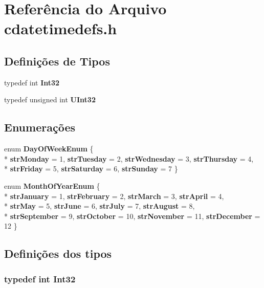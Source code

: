 \section{Referência do Arquivo cdatetimedefs.\+h}
\label{cdatetimedefs_8h}
\subsection*{Definições de Tipos}
\begin{DoxyCompactItemize}
\item 
typedef int {\bf Int32}
\item 
typedef unsigned int {\bf U\+Int32}
\end{DoxyCompactItemize}
\subsection*{Enumerações}
\begin{DoxyCompactItemize}
\item 
enum {\bf Day\+Of\+Week\+Enum} \{ \\*
{\bf str\+Monday} = 1, 
{\bf str\+Tuesday} = 2, 
{\bf str\+Wednesday} = 3, 
{\bf str\+Thursday} = 4, 
\\*
{\bf str\+Friday} = 5, 
{\bf str\+Saturday} = 6, 
{\bf str\+Sunday} = 7
 \}
\item 
enum {\bf Month\+Of\+Year\+Enum} \{ \\*
{\bf str\+January} = 1, 
{\bf str\+February} = 2, 
{\bf str\+March} = 3, 
{\bf str\+April} = 4, 
\\*
{\bf str\+May} = 5, 
{\bf str\+June} = 6, 
{\bf str\+July} = 7, 
{\bf str\+August} = 8, 
\\*
{\bf str\+September} = 9, 
{\bf str\+October} = 10, 
{\bf str\+November} = 11, 
{\bf str\+December} = 12
 \}
\end{DoxyCompactItemize}


\subsection{Definições dos tipos}
\subsubsection[{Int32}]{\setlength{\rightskip}{0pt plus 5cm}typedef int {\bf Int32}}\label{cdatetimedefs_8h_adf1ef98b7070177c7c709b0b82276a07}


